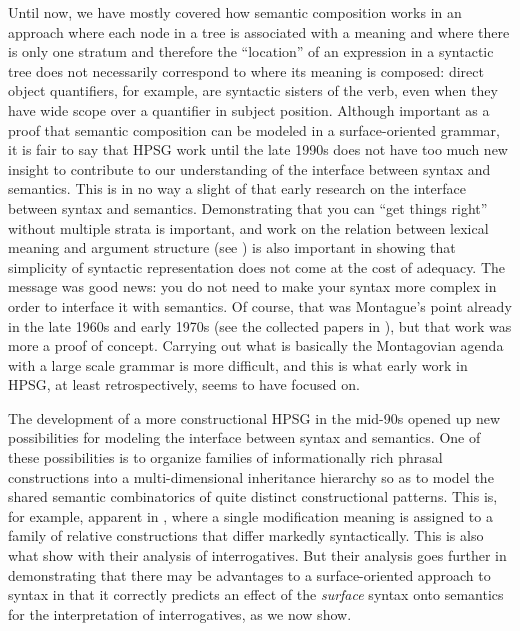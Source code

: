 \documentclass[output=paper
 	        ,biblatex
                ,babelshorthands
                ,newtxmath
                ,draftmode
                ,colorlinks, citecolor=brown
]{langscibook}
\begin{document}
Until now, we have mostly covered how semantic composition works in an approach where each node in a tree is associated with a meaning and where there is only one stratum and therefore the ``location'' of an expression in a syntactic tree does not necessarily correspond to where its meaning is composed: direct object quantifiers, for example, are syntactic sisters of the verb, even when they have wide scope over a quantifier in subject position. Although important as a proof that semantic composition can be modeled in a surface-oriented grammar, it is fair to say that HPSG work until the late 1990s does not have too much new insight to contribute to our understanding of the interface between syntax and semantics. This is in no way a slight of that early research on the interface between syntax and semantics. Demonstrating that you can ``get things right'' without multiple strata is important, and work on the relation between lexical meaning and argument structure (see ) is also important in showing that simplicity of syntactic representation does not come at the cost of adequacy. The message was good news: you do not need to make your syntax more complex in order to interface it with semantics. Of course, that was Montague's point already in the late 1960s and early 1970s (see the collected papers in \citealt{Montague1974}), but that work was more a proof of concept.  Carrying out what is basically the Montagovian agenda with a large scale grammar is more difficult, and this is what early work in HPSG, at least retrospectively, seems to have focused on.

The development of a more constructional HPSG in the mid-90s opened up new possibilities for modeling the interface between syntax and semantics. One of these possibilities is to organize families of informationally rich phrasal constructions into a multi-dimensional inheritance hierarchy so as to model the shared semantic combinatorics of quite distinct constructional patterns. This is, for example, apparent in \citet{Sag1997}, where a single modification meaning is assigned to a family of relative constructions that differ markedly syntactically. This is also what \citet{GinzburgandSag2001} show with their analysis of interrogatives. But their analysis goes further in demonstrating that there may be advantages to a surface-oriented approach to syntax in that it correctly predicts an effect of the \emph{surface} syntax onto semantics for the interpretation of interrogatives, as we now show. 
\end{document}
